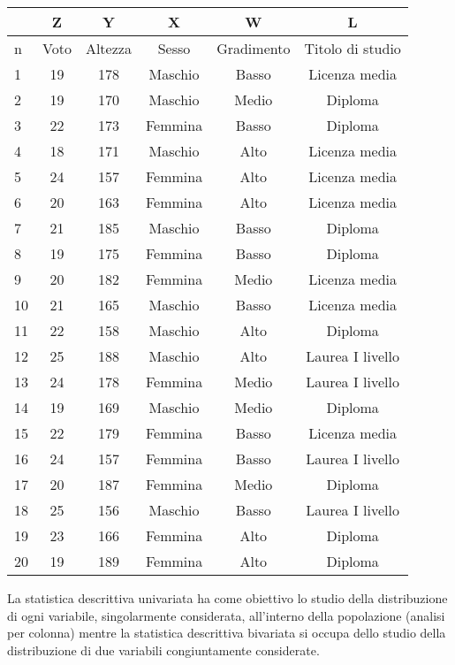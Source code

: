 {\footnotesize
\begin{center}
\begin{tabular}{|p{1.5cm}|c|c|c|c|c|}
\hline
        &Z&     Y       &X      &W      &L\\
        \hline
n & Voto& Altezza &Sesso& Gradimento& Titolo di studio\\
\hline
         1 & 19 &     178  & Maschio& Basso & Licenza media\\
        \hline
         2 & 19 &     170  & Maschio & Medio & Diploma\\
        \hline
         3 & 22 & 173 & Femmina & Basso & Diploma\\
        \hline
         4 & 18 &    171 & Maschio & Alto & Licenza media\\
        \hline
         5 & 24 &     157 & Femmina & Alto & Licenza media\\
        \hline
         6 & 20 &163 & Femmina & Alto & Licenza media\\
        \hline
         7 & 21 &     185 & Maschio & Basso & Diploma\\
        \hline
         8 & 19 &    175 & Femmina & Basso & Diploma\\
        \hline
         9 &      20&     182 & Femmina & Medio & Licenza media\\
        \hline
        10 &     21      &165 & Maschio & Basso & Licenza media\\
        \hline
        11 &22     &158 & Maschio & Alto & Diploma\\
        \hline
        12 &25     &188 & Maschio & Alto & Laurea I livello\\
        \hline
        13 &24&    178 & Femmina & Medio & Laurea I livello\\
        \hline
        14 &19&    169 & Maschio & Medio & Diploma\\
        \hline
        15 &22&    179 & Femmina & Basso & Licenza media\\
        \hline
        16 &     24      &157 &Femmina & Basso & Laurea I livello\\
        \hline
        17 & 20      &187 & Femmina & Medio & Diploma\\
        \hline
        18 & 25 &    156 & Maschio & Basso & Laurea I livello\\
        \hline
        19 &     23&     166 & Femmina & Alto & Diploma\\
        \hline
        20 &     19      &189 & Femmina & Alto & Diploma\\
        \hline
\end{tabular}
\end{center}
}
\vspace{12pt}
La statistica descrittiva univariata ha come obiettivo lo studio della 
distribuzione di ogni variabile, singolarmente considerata, all'interno 
della popolazione (analisi per colonna) mentre la statistica descrittiva 
bivariata si occupa dello studio della distribuzione di due variabili 
congiuntamente considerate.

